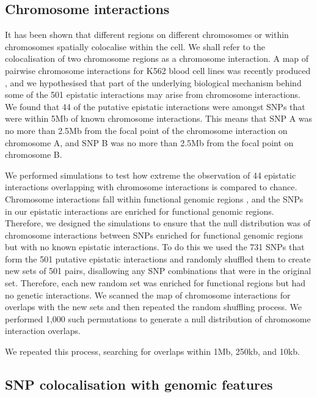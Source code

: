 \documentclass{article}
\begin{document}
\subsection{Chromosome interactions}

It has been shown \cite{Lieberman-Aiden2009} that different regions on different chromosomes or within chromosomes spatially colocalise within the cell. We shall refer to the colocalisation of two chromosome regions as a chromosome interaction. A map of pairwise chromosome interactions for K562 blood cell lines was recently produced \cite{Lan2012}, and we hypothesised that part of the underlying biological mechanism behind some of the 501 epistatic interactions may arise from chromosome interactions. We found that 44 of the putative epistatic interactions were amongst SNPs that were within 5Mb of known chromosome interactions. This means that SNP A was no more than 2.5Mb from the focal point of the chromosome interaction on chromosome A, and SNP B was no more than 2.5Mb from the focal point on chromosome B.

We performed simulations to test how extreme the observation of 44 epistatic interactions overlapping with chromosome interactions is compared to chance. Chromosome interactions fall within functional genomic regions \cite{Lieberman-Aiden2009, Lan2012}, and the SNPs in our epistatic interactions are enriched for functional genomic regions. Therefore, we designed the simulations to ensure that the null distribution was of chromosome interactions between SNPs enriched for functional genomic regions but with no known epistatic interactions. To do this we used the 731 SNPs that form the 501 putative epistatic interactions and randomly shuffled them to create new sets of 501 pairs, disallowing any SNP combinations that were in the original set. Therefore, each new random set was enriched for functional regions but had no genetic interactions. We scanned the map of chromosome interactions for overlaps with the new sets and then repeated the random shuffling process. We performed 1,000 such permutations to generate a null distribution of chromosome interaction overlaps.

We repeated this process, searching for overlaps within 1Mb, 250kb, and 10kb.


\subsection{SNP colocalisation with genomic features}
\label{sub:snp_colocalisation_with_genomic_features}
\end{document}
